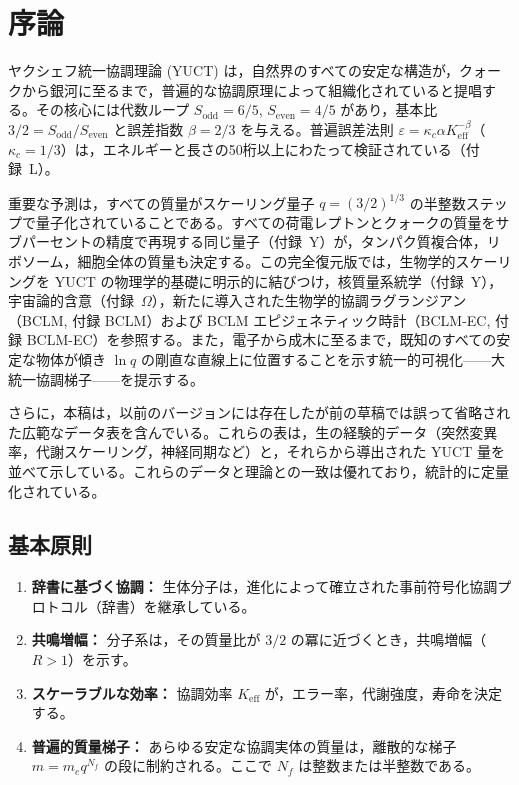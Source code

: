 \documentclass[11pt,a4paper]{article}
\begin{document}
	\tableofcontents
	\newpage
	
	\section{序論}
	
	ヤクシェフ統一協調理論 (YUCT) は，自然界のすべての安定な構造が，クォークから銀河に至るまで，普遍的な協調原理によって組織化されていると提唱する。その核心には代数ループ \(S_{\mathrm{odd}} = 6/5\), \(S_{\mathrm{even}} = 4/5\) があり，基本比 \(3/2 = S_{\mathrm{odd}}/S_{\mathrm{even}}\) と誤差指数 \(\beta = 2/3\) を与える。普遍誤差法則 \(\varepsilon = \kappa_c \alpha K_{\mathrm{eff}}^{-\beta}\)（\(\kappa_c = 1/3\)）は，エネルギーと長さの50桁以上にわたって検証されている（付録~L）。
	
	重要な予測は，すべての質量がスケーリング量子 \(q = (3/2)^{1/3}\) の半整数ステップで量子化されていることである。すべての荷電レプトンとクォークの質量をサブパーセントの精度で再現する同じ量子（付録~Y）が，タンパク質複合体，リボソーム，細胞全体の質量も決定する。この完全復元版では，生物学的スケーリングを YUCT の物理学的基礎に明示的に結びつけ，核質量系統学（付録~Y），宇宙論的含意（付録~\(\Omega\)），新たに導入された生物学的協調ラグランジアン（BCLM, 付録 BCLM）および BCLM エピジェネティック時計（BCLM-EC, 付録 BCLM-EC）を参照する。また，電子から成木に至るまで，既知のすべての安定な物体が傾き \(\ln q\) の剛直な直線上に位置することを示す統一的可視化——大統一協調梯子——を提示する。
	
	さらに，本稿は，以前のバージョンには存在したが前の草稿では誤って省略された広範なデータ表を含んでいる。これらの表は，生の経験的データ（突然変異率，代謝スケーリング，神経同期など）と，それらから導出された YUCT 量を並べて示している。これらのデータと理論との一致は優れており，統計的に定量化されている。
	
	\subsection{基本原則}
	
	\begin{enumerate}
		\item \textbf{辞書に基づく協調：} 生体分子は，進化によって確立された事前符号化協調プロトコル（辞書）を継承している。
		\item \textbf{共鳴増幅：} 分子系は，その質量比が \(3/2\) の冪に近づくとき，共鳴増幅（\(R > 1\)）を示す。
		\item \textbf{スケーラブルな効率：} 協調効率 \(K_{\mathrm{eff}}\) が，エラー率，代謝強度，寿命を決定する。
		\item \textbf{普遍的質量梯子：} あらゆる安定な協調実体の質量は，離散的な梯子 \(m = m_e q^{N_f}\) の段に制約される。ここで \(N_f\) は整数または半整数である。
	\end{enumerate}
	
\end{document}
